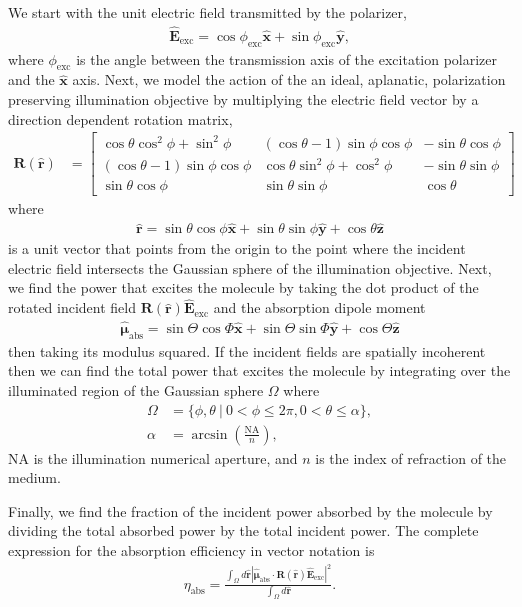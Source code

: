\documentclass[10pt]{article}
\providecommand{\mb}[1]{\mathbf{#1}}
\providecommand{\mh}[1]{\mathbf{\hat{#1}}}
\providecommand{\bs}[1]{\boldsymbol{#1}}
\begin{document}
We start with the unit electric field transmitted by the polarizer,
\begin{align}
 \hat{\mb{E}}_{\text{exc}} = \cos\phi_{\text{exc}}\hat{\mb{x}} +
\sin\phi_{\text{exc}}\hat{\mb{y}},\label{eq:excfield}
\end{align}
where $\phi_{\text{exc}}$ is the angle between the transmission axis of the
excitation polarizer and the $\mh{x}$ axis. Next, we model the action of the an
ideal, aplanatic, polarization preserving illumination objective by multiplying
the electric field vector by a direction dependent rotation matrix,
  \begin{align}
  \mb{R}(\mh{r}) &= \begin{bmatrix} \cos\theta\cos^2\phi + \sin^2\phi & (\cos\theta -1)\sin\phi\cos\phi & -\sin\theta\cos\phi\\ (\cos\theta - 1)\sin\phi\cos\phi & \cos\theta\sin^2\phi + \cos^2\phi & -\sin\theta\sin\phi \\ \sin\theta\cos\phi& \sin\theta\sin\phi & \cos\theta \end{bmatrix}
  \end{align}
  where
  \begin{align}
   \hat{\mb{r}} = \sin\theta\cos\phi\hat{\mb{x}} + \sin\theta\sin\phi\hat{\mb{y}} + \cos\theta\hat{\mb{z}} 
  \end{align}
  is a unit vector that points from the origin to the point where the incident
  electric field intersects the Gaussian sphere of the illumination
  objective. Next, we find the power that excites the molecule by taking the
  dot product of the rotated incident field $\mb{R}(\mh{r})\mh{E}_{\text{exc}}$
  and the absorption dipole moment
\begin{align}
  \hat{\bs{\mu}}_{\text{abs}} = \sin\Theta\cos\Phi\hat{\mb{x}} + \sin\Theta\sin\Phi\hat{\mb{y}} + \cos\Theta\hat{\mb{z}}
\end{align}
then taking its modulus squared. If the incident fields are spatially incoherent
then we can find the total power that excites the molecule by integrating over the
illuminated region of the Gaussian sphere $\Omega$ where
\begin{align}
  \Omega &= \{\phi, \theta\ |\ 0 < \phi \leq 2\pi, 0 < \theta \leq \alpha\}, \\
  \alpha &= \arcsin\left(\frac{\text{NA}}{n}\right), \label{eq:alpha}
\end{align}
NA is the illumination numerical aperture, and $n$ is the index of refraction of
the medium.

Finally, we find the fraction of the incident power absorbed by the molecule
by dividing the total absorbed power by the total incident power. The complete
expression for the absorption efficiency in vector notation is
\begin{align}
  \eta_{\text{abs}} = \frac{\int_{\Omega}d\mh{r}|\hat{\bs{\mu}}_{\text{abs}}\cdot\mb{R}(\mh{r})\mh{E}_{\text{exc}}|^2}{\int_{\Omega}d\mh{r}}\label{eq:abs}. 
\end{align}
\end{document}

